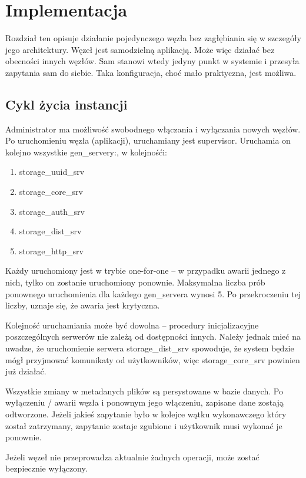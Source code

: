 \section{Implementacja}
Rozdział ten opisuje działanie pojedynczego węzła bez zagłębiania się w szczegóły jego architektury. Węzeł jest samodzielną aplikacją. Może więc działać bez obecności innych węzłów. Sam stanowi wtedy jedyny punkt w systemie i przesyła zapytania sam do siebie. Taka konfiguracja, choć mało praktyczna, jest możliwa.



\subsection{Cykl życia instancji}
Administrator ma możliwość swobodnego włączania i wyłączania nowych węzłów. Po uruchomieniu węzła (aplikacji), uruchamiany jest supervisor. Uruchamia on kolejno wszystkie gen\_servery:, w kolejnośći:
\begin{enumerate}
	\item storage\_uuid\_srv
	\item storage\_core\_srv
	\item storage\_auth\_srv
	\item storage\_dist\_srv
	\item storage\_http\_srv
\end{enumerate}

Każdy uruchomiony jest w trybie one-for-one – w przypadku awarii jednego z nich, tylko on zostanie uruchomiony ponownie. Maksymalna liczba prób ponownego uruchomienia dla każdego gen\_servera wynosi 5. Po przekroczeniu tej liczby, uznaje się, że awaria jest krytyczna.

Kolejność uruchamiania może być dowolna – procedury inicjalizacyjne poszczególnych serwerów nie zależą od dostępności innych. Należy jednak mieć na uwadze, że uruchomienie serwera storage\_dist\_srv spowoduje, że system będzie mógł przyjmować komunikaty od użytkowników, więc storage\_core\_srv powinien już działać.

Wszystkie zmiany w metadanych plików są persystowane w bazie danych. Po wyłączeniu / awarii węzła i ponownym jego włączeniu, zapisane dane zostają odtworzone. Jeżeli jakieś zapytanie było w kolejce wątku wykonawczego który został zatrzymany, zapytanie zostaje zgubione i użytkownik musi wykonać je ponownie.

Jeżeli węzeł nie przeprowadza aktualnie żadnych operacji, może zostać bezpiecznie wyłączony.



